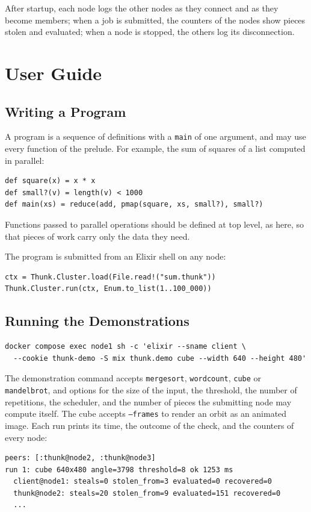 \documentclass{scrartcl}
\begin{document}
After startup, each node logs the other nodes as they connect and as they become members; when a job is submitted, the counters of the nodes show pieces stolen and evaluated; when a node is stopped, the others log its disconnection.

\section{User Guide}\label{user-guide}

\subsection{Writing a Program}

A program is a sequence of definitions with a \texttt{main} of one argument, and may use every function of the prelude.
%
For example, the sum of squares of a list computed in parallel:
\begin{lstlisting}
def square(x) = x * x
def small?(v) = length(v) < 1000
def main(xs) = reduce(add, pmap(square, xs, small?), small?)
\end{lstlisting}
%
Functions passed to parallel operations should be defined at top level, as here, so that pieces of work carry only the data they need.

The program is submitted from an Elixir shell on any node:
\begin{lstlisting}
ctx = Thunk.Cluster.load(File.read!("sum.thunk"))
Thunk.Cluster.run(ctx, Enum.to_list(1..100_000))
\end{lstlisting}

\subsection{Running the Demonstrations}

\begin{lstlisting}
docker compose exec node1 sh -c 'elixir --sname client \
  --cookie thunk-demo -S mix thunk.demo cube --width 640 --height 480'
\end{lstlisting}

The demonstration command accepts \texttt{mergesort}, \texttt{wordcount}, \texttt{cube} or \texttt{mandelbrot}, and options for the size of the input, the threshold, the number of repetitions, the scheduler, and the number of pieces the submitting node may compute itself.
%
The cube accepts \texttt{--frames} to render an orbit as an animated image.
%
Each run prints its time, the outcome of the check, and the counters of every node:
\begin{lstlisting}
peers: [:thunk@node2, :thunk@node3]
run 1: cube 640x480 angle=3798 threshold=8 ok 1253 ms
  client@node1: steals=0 stolen_from=3 evaluated=0 recovered=0
  thunk@node2: steals=20 stolen_from=9 evaluated=151 recovered=0
  ...
\end{lstlisting}
\end{document}
